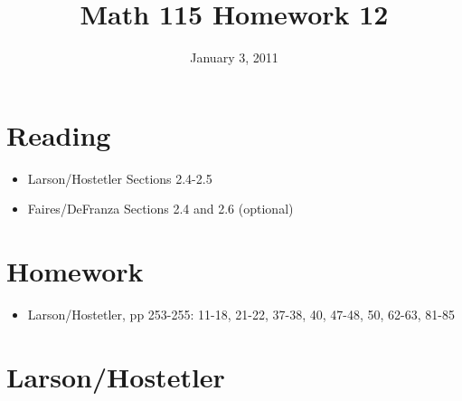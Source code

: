 \documentclass[fleqn,addpoints]{exam}
\title{Math 115 Homework 12}
\date{January 3, 2011}
\begin{document}
\maketitle
 

\ifprintanswers
\else
\section{Reading}
\begin{itemize}
  \item Larson/Hostetler Sections 2.4-2.5
  \item Faires/DeFranza Sections 2.4 and 2.6 (optional)
\end{itemize}

\section{Homework}

\begin{itemize}
  \item Larson/Hostetler, pp 253-255: 11-18, 21-22, 37-38, 40, 47-48, 50, 62-63, 81-85
\end{itemize}

\fi

\ifprintanswers

\section{Larson/Hostetler}
\end{document}

